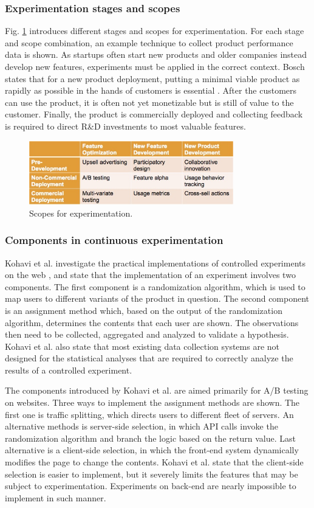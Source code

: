 \documentclass[english]{tktltiki2}
\theoremstyle{definition}
\theoremstyle{remark}
\begin{document}
\subsubsection{Experimentation stages and scopes}
Fig. \ref{fig4} introduces different stages and scopes for experimentation. For each stage and scope combination, an example technique to collect product performance data is shown. As startups often start new products and older companies instead develop new features, experiments must be applied in the correct context. Bosch states that for a new product deployment, putting a minimal viable product as rapidly as possible in the hands of customers is essential \cite{bosch2012building}. After the customers can use the product, it is often not yet monetizable but is still of value to the customer. Finally, the product is commercially deployed and collecting feedback is required to direct R\&D investments to most valuable features.
\begin{figure}[!htbp]
	\centering
	\includegraphics[width=3.5in]{scopes.jpg}
	\caption{Scopes for experimentation\cite{bosch2012building}.}
	\label{fig4}
\end{figure}

\subsubsection{Components in continuous experimentation}
Kohavi et al. investigate the practical implementations of controlled experiments on the web \cite{kohavi2007practical}, and state that the implementation of an experiment involves two components. The first component is a randomization algorithm, which is used to map users to different variants of the product in question. The second component is an assignment method which, based on the output of the randomization algorithm, determines the contents that each user are shown. The observations then need to be collected, aggregated and analyzed to validate a hypothesis. Kohavi et al. also state that most existing data collection systems are not designed for the statistical analyses that are required to correctly analyze the results of a controlled experiment.

The components introduced by Kohavi et al. are aimed primarily for A/B testing on websites. Three ways to implement the assignment methods are shown. The first one is traffic splitting, which directs users to different fleet of servers. An alternative methods is server-side selection, in which API calls invoke the randomization algorithm and branch the logic based on the return value. Last alternative is a client-side selection, in which the front-end system dynamically modifies the page to change the contents. Kohavi et al. state that the client-side selection is easier to implement, but it severely limits the features that may be subject to experimentation. Experiments on back-end are nearly impossible to implement in such manner.
\end{document}
